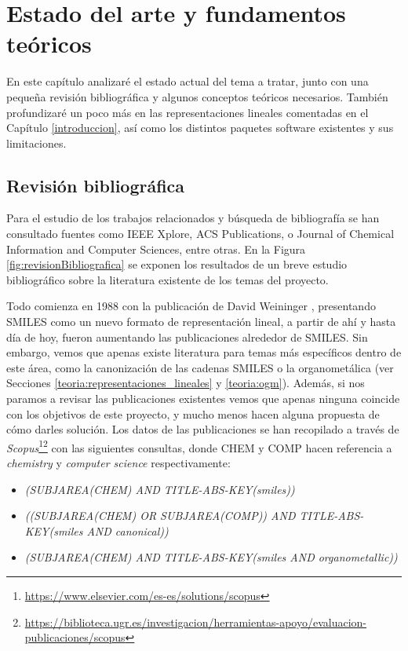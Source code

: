 
\chapter{Estado del arte y fundamentos teóricos}\label{estadoArte}

En este capítulo analizaré el estado actual del tema a tratar, junto con una pequeña revisión bibliográfica y algunos conceptos teóricos necesarios. También profundizaré un poco más en las representaciones lineales comentadas en el Capítulo \ref{introduccion}, así como los distintos paquetes software existentes y sus limitaciones. 

\section{Revisión bibliográfica} \label{revision_bib}
Para el estudio de los trabajos relacionados y búsqueda de bibliografía se han consultado fuentes como IEEE Xplore, ACS Publications, o Journal of Chemical Information and Computer Sciences, entre otras. En la Figura \ref{fig:revisionBibliografica} se exponen los resultados de un breve estudio bibliográfico sobre la literatura existente de los temas del proyecto. 

Todo comienza en 1988 con la publicación de David Weininger \cite{weininger_smiles_1988}, presentando SMILES como un nuevo formato de representación lineal, a partir de ahí y hasta día de hoy, fueron aumentando las publicaciones alrededor de SMILES. Sin embargo, vemos que apenas existe literatura para temas más específicos dentro de este área, como la canonización de las cadenas SMILES o la organometálica (ver Secciones \ref{teoria:representaciones_lineales} y \ref{teoria:ogm}). Además, si nos paramos a revisar las publicaciones existentes vemos que apenas ninguna coincide con los objetivos de este proyecto, y mucho menos hacen alguna propuesta de cómo darles solución. Los datos de las publicaciones se han recopilado a través de \textit{Scopus}\footnote{\url{https://www.elsevier.com/es-es/solutions/scopus}}\footnotecomma\footnote{\url{https://biblioteca.ugr.es/investigacion/herramientas-apoyo/evaluacion-publicaciones/scopus}} con las siguientes consultas, donde CHEM y COMP hacen referencia a \textit{chemistry} y \textit{computer science} respectivamente: 
\begin{itemize}
    \item {\footnotesize \textit{(SUBJAREA(CHEM) AND TITLE-ABS-KEY(smiles))}} 
    \item {\footnotesize \textit{((SUBJAREA(CHEM) OR SUBJAREA(COMP)) AND TITLE-ABS-KEY(smiles AND canonical))}}
    \item {\footnotesize \textit{(SUBJAREA(CHEM) AND TITLE-ABS-KEY(smiles AND organometallic))}}
\end{itemize}

